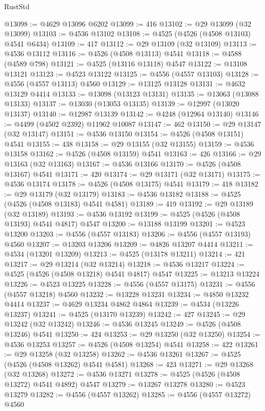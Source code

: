 \begin{lexlean}{RustStd}
\begin{coremodule}
@13098 := @4629 @13096 @6202
@13099 := 416
@13102 := @29 @13099 (@32 @13099)
@13103 := @4536 @13102
@13108 := @4525 (@4526 (@4508 @13103) @4541 @6434)
@13109 := 417
@13112 := @29 @13109 (@32 @13109)
@13113 := @4536 @13112
@13116 := @4526 (@4508 @13113) @4541
@13118 := @4588 (@4589 @798)
@13121 := @4525 (@13116 @13118) @4547
@13122 := @13108 @13121
@13123 := @4523 @13122
@13125 := @4556 (@4557 @13103)
@13128 := @4556 (@4557 @13113) @4560
@13129 := @13125 @13128
@13131 := @4632 @13129 @4414
@13133 := @13098 (@13123 @13131)
@13135 := @13063 (@13088 @13133)
@13137 := @13030 (@13053 @13135)
@13139 := @12997 (@13020 @13137)
@13140 := @12987 @13139
@13142 := @4248 (@12964 @13140)
@13146 := @4499 (@4502 @2392) @11962 @10087
@13147 := 462
@13150 := @29 @13147 (@32 @13147)
@13151 := @4536 @13150
@13154 := @4526 (@4508 @13151) @4541
@13155 := 438
@13158 := @29 @13155 (@32 @13155)
@13159 := @4536 @13158
@13162 := @4526 (@4508 @13159) @4541
@13163 := 426
@13166 := @29 @13163 (@32 @13163)
@13167 := @4536 @13166
@13170 := @4526 (@4508 @13167) @4541
@13171 := 420
@13174 := @29 @13171 (@32 @13171)
@13175 := @4536 @13174
@13178 := @4526 (@4508 @13175) @4541
@13179 := 418
@13182 := @29 @13179 (@32 @13179)
@13183 := @4536 @13182
@13188 := @4525 (@4526 (@4508 @13183) @4541 @4581)
@13189 := 419
@13192 := @29 @13189 (@32 @13189)
@13193 := @4536 @13192
@13199 := @4525 (@4526 (@4508 @13193) @4541 @4817) @4547
@13200 := @13188 @13199
@13201 := @4523 @13200
@13203 := @4556 (@4557 @13183)
@13206 := @4556 (@4557 @13193) @4560
@13207 := @13203 @13206
@13209 := @4826 @13207 @4414
@13211 := @4534 (@13201 @13209)
@13213 := @4525 (@13178 @13211)
@13214 := 421
@13217 := @29 @13214 (@32 @13214)
@13218 := @4536 @13217
@13224 := @4525 (@4526 (@4508 @13218) @4541 @4817) @4547
@13225 := @13213 @13224
@13226 := @4523 @13225
@13228 := @4556 (@4557 @13175)
@13231 := @4556 (@4557 @13218) @4560
@13232 := @13228 @13231
@13234 := @4850 @13232 @4414
@13237 := @4629 @13234 @4862 @4864
@13239 := @4534 (@13226 @13237)
@13241 := @4525 (@13170 @13239)
@13242 := 427
@13245 := @29 @13242 (@32 @13242)
@13246 := @4536 @13245
@13249 := @4526 (@4508 @13246) @4541
@13250 := 424
@13253 := @29 @13250 (@32 @13250)
@13254 := @4536 @13253
@13257 := @4526 (@4508 @13254) @4541
@13258 := 422
@13261 := @29 @13258 (@32 @13258)
@13262 := @4536 @13261
@13267 := @4525 (@4526 (@4508 @13262) @4541 @4581)
@13268 := 423
@13271 := @29 @13268 (@32 @13268)
@13272 := @4536 @13271
@13278 := @4525 (@4526 (@4508 @13272) @4541 @4892) @4547
@13279 := @13267 @13278
@13280 := @4523 @13279
@13282 := @4556 (@4557 @13262)
@13285 := @4556 (@4557 @13272) @4560

\end{coremodule}
\end{lexlean}
